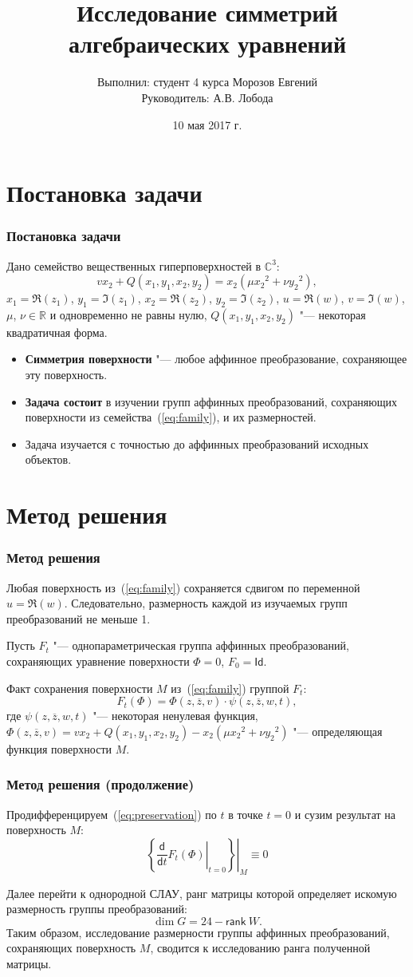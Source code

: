 \documentclass[russian,hyperref={unicode}]{beamer}
\title{Исследование симметрий алгебраических уравнений}
\institute
{
	Воронежский Государственный Университет \\
	Факультет Компьютерных Наук \\
	Кафедра Цифровых Технологий
}
\author
{
	Выполнил: студент 4 курса Морозов Евгений \\
	Руководитель: А.В. Лобода
}
\date{10 мая 2017 г.}
\begin{document}
\frame{\titlepage}

\section{Постановка задачи}
\frame
{
  \frametitle{Постановка задачи}
  Дано семейство вещественных гиперповерхностей в $\mathbb{C}^3$:
  \begin{equation}\label{eq:family}
    v x_2 + Q(x_1, y_1, x_2, y_2) = x_2 (\mu {x_2}^2 + \nu {y_2}^2),
  \end{equation}
  $x_1 = \Re(z_1)$, $y_1 = \Im(z_1)$, $x_2 = \Re(z_2)$, $y_2 = \Im(z_2)$, $u = \Re(w)$,
  $v = \Im(w)$, $\mu$, $\nu \in \mathbb{R}$ и одновременно не равны нулю, $Q(x_1, y_1,
  x_2, y_2)$ "--- некоторая квадратичная форма.

  \begin{itemize}
	\item \textbf{Симметрия поверхности} "--- любое аффинное преобразование, сохраняющее эту поверхность.
    \item \textbf{Задача состоит} в изучении групп аффинных преобразований, сохраняющих поверхности из семейства~(\ref{eq:family}), и их размерностей.
	\item Задача изучается с точностью до аффинных преобразований исходных объектов.
  \end{itemize}
}
\section{Метод решения}
\frame
{
  \frametitle{Метод решения}
  Любая поверхность из~(\ref{eq:family}) сохраняется сдвигом по переменной $u = \Re(w)$. Следовательно, размерность каждой из изучаемых групп преобразований не меньше 1. 
  
  Пусть $F_t$ "--- однопараметрическая группа аффинных преобразований, сохраняющих уравнение поверхности $\Phi = 0$, $F_0 = \mathsf{Id}$. 
  
  Факт сохранения поверхности $M$ из~(\ref{eq:family}) группой $F_t$:
  \begin{equation}\label{eq:preservation}
  	F_t(\Phi) = \Phi(z, \overline{z}, v) \cdot \psi(z, \overline{z}, w, t),
  \end{equation}
  где $\psi(z, \overline{z}, w, t)$ "--- некоторая ненулевая функция, $\Phi(z, \overline{z}, v) = v x_2 + Q(x_1, y_1, x_2, y_2) - x_2 (\mu {x_2}^2 + \nu {y_2}^2)$ "--- определяющая функция поверхности $M$.
}
\frame
{
  \frametitle{Метод решения (продолжение)}
  Продифференцируем~(\ref{eq:preservation}) по $t$ в точке $t=0$ и сузим результат на поверхность $M$:
  \begin{equation}\label{eq:main_eq}
  	\left.\left\{ \left.\frac{\mathsf d}{\mathsf d t}F_t(\Phi) \right|_{t=0}\right\}\right|_{M} \equiv 0
  \end{equation}
  
  Далее перейти к однородной СЛАУ, ранг матрицы которой определяет искомую размерность группы преобразований:
  $$
  	\dim G = 24 - \mathsf{rank}\ W.
  $$
  Таким образом, исследование размерности группы аффинных преобразований, сохраняющих поверхность $M$, сводится к исследованию ранга полученной матрицы.
}
\end{document}

